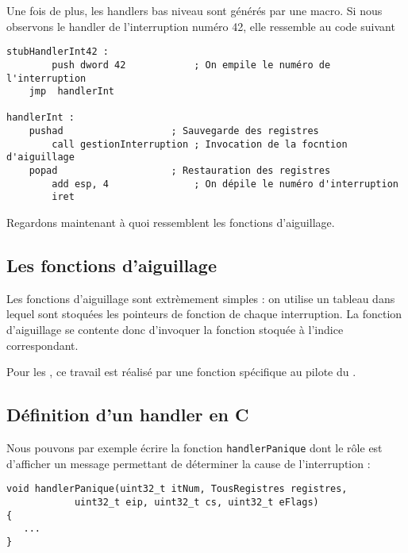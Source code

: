 \begin{itemize}
   Une fois de plus, les handlers bas niveau sont générés par une
macro. Si nous observons le handler de l'interruption numéro 42, elle
ressemble au code suivant

\begin{lstlisting}
stubHandlerInt42 :
        push dword 42            ; On empile le numéro de l'interruption
	jmp  handlerInt
        
handlerInt :
	pushad                   ; Sauvegarde des registres
        call gestionInterruption ; Invocation de la focntion d'aiguillage
	popad                    ; Restauration des registres
        add esp, 4               ; On dépile le numéro d'interruption
        iret
\end{lstlisting}

   Regardons maintenant à quoi ressemblent les fonctions d'aiguillage.

%      
\subsection{Les fonctions d'aiguillage}

   Les fonctions d'aiguillage sont extrèmement simples : on utilise un
tableau dans lequel sont stoquées les pointeurs de fonction de chaque
interruption. La fonction d'aiguillage se contente donc d'invoquer la
fonction stoquée à l'indice correspondant.

   Pour les \irq, ce travail est réalisé par une fonction spécifique
au pilote du \pic.
   
%      
\subsection{Définition d'un handler en C}

   Nous pouvons par exemple écrire la fonction
\lstinline!handlerPanique! dont le rôle est d'afficher un message
permettant de déterminer la cause de l'interruption :

\begin{lstlisting}
void handlerPanique(uint32_t itNum, TousRegistres registres,
		    uint32_t eip, uint32_t cs, uint32_t eFlags)
{
   ...
}
\end{lstlisting}


\end{itemize}
